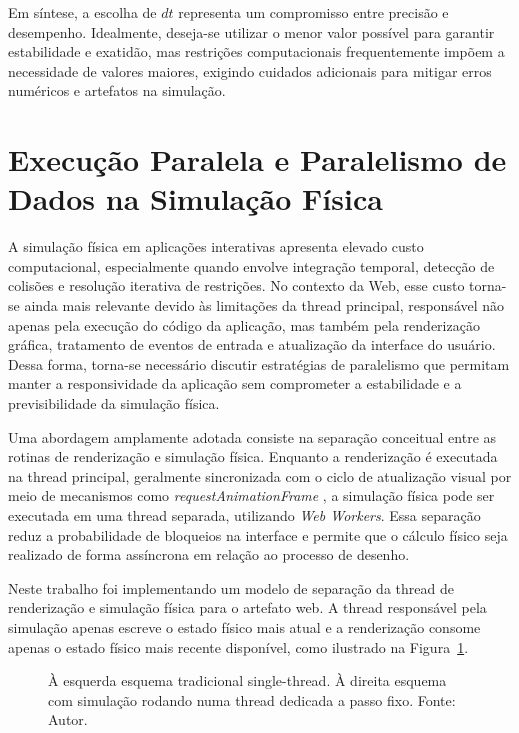 Em síntese, a escolha de $dt$ representa um compromisso entre precisão e desempenho. Idealmente, deseja-se utilizar o menor valor possível para garantir estabilidade e exatidão, mas restrições computacionais frequentemente impõem a necessidade de valores maiores, exigindo cuidados adicionais para mitigar erros numéricos e artefatos na simulação.

\section{Execução Paralela e Paralelismo de Dados na Simulação Física}

A simulação física em aplicações interativas apresenta elevado custo computacional, especialmente quando envolve integração temporal, detecção de colisões e resolução iterativa de restrições. No contexto da Web, esse custo torna-se ainda mais relevante devido às limitações da thread principal, responsável não apenas pela execução do código da aplicação, mas também pela renderização gráfica, tratamento de eventos de entrada e atualização da interface do usuário. Dessa forma, torna-se necessário discutir estratégias de paralelismo que permitam manter a responsividade da aplicação sem comprometer a estabilidade e a previsibilidade da simulação física.

Uma abordagem amplamente adotada consiste na separação conceitual entre as rotinas de renderização e simulação física. Enquanto a renderização é executada na thread principal, geralmente sincronizada com o ciclo de atualização visual por meio de mecanismos como \textit{requestAnimationFrame}
, a simulação física pode ser executada em uma thread separada, utilizando \textit{Web Workers}. Essa separação reduz a probabilidade de bloqueios na interface e permite que o cálculo físico seja realizado de forma assíncrona em relação ao processo de desenho.

Neste trabalho foi implementando um modelo de separação da thread de renderização e simulação física para o artefato web. A thread responsável pela simulação apenas escreve o estado físico mais atual e a renderização consome apenas o estado físico mais recente disponível, como ilustrado na Figura~\ref{fig:diagrama-threaded}.

\begin{figure}[htb]
	\centering
	
	\caption{À esquerda esquema tradicional single-thread. À direita esquema com simulação rodando numa thread dedicada a passo fixo. Fonte: Autor.}
	\label{fig:diagrama-threaded}
\end{figure}

